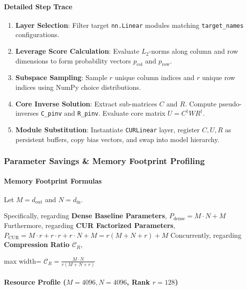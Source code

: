 \paragraph{Detailed Step Trace}
\begin{enumerate}
\item \textbf{Layer Selection}: Filter target \texttt{nn.Linear} modules matching \texttt{target\_names} configurations.
\item \textbf{Leverage Score Calculation}: Evaluate $L_2$-norms along column and row dimensions to form probability vectors $p_{\text{col}}$ and $p_{\text{row}}$.
\item \textbf{Subspace Sampling}: Sample $r$ unique column indices and $r$ unique row indices using NumPy choice distributions.
\item \textbf{Core Inverse Solution}: Extract sub-matrices $C$ and $R$. Compute pseudo-inverses \texttt{C\_pinv} and \texttt{R\_pinv}. Evaluate core matrix $U = C^{\dagger} W R^{\dagger}$.
\item \textbf{Module Substitution}: Instantiate \texttt{CURLinear} layer, register $C, U, R$ as persistent buffers, copy bias vectors, and swap into model hierarchy.


\end{enumerate}
\subsubsection*{Parameter Savings \& Memory Footprint Profiling}

\paragraph{Memory Footprint Formulas}
Let $M = d_{\text{out}}$ and $N = d_{\text{in}}$.

Specifically, regarding \textbf{Dense Baseline Parameters}, $P_{\text{dense}} = M \cdot N + M$ Furthermore, regarding \textbf{CUR Factorized Parameters}, $P_{\text{CUR}} = M \cdot r + r \cdot r + r \cdot N + M = r(M + N + r) + M$ Concurrently, regarding \textbf{Compression Ratio $\mathcal{C}_R$},

\begin{center}
\begin{adjustbox}{max width=\columnwidth}
$\displaystyle
\mathcal{C}_R = \frac{M \cdot N}{r(M + N + r)}
$
\end{adjustbox}
\end{center}

\paragraph{Resource Profile ($M = 4096, N = 4096$, Rank $r = 128$)}

